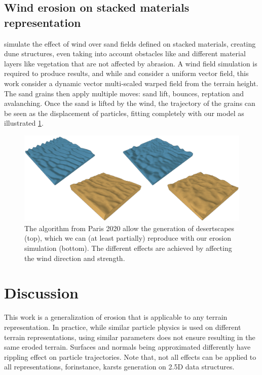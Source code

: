 \subsection{Wind erosion on stacked materials representation}
\citep{Paris2019b} simulate the effect of wind over sand fields defined on stacked materials, creating dune structures, even taking into account obstacles like \cite{Roa2004} and different material layers like vegetation \cite{Cordonnier2017a} that are not affected by abrasion\cite{Paris2019b}. A wind field simulation is required to produce results, and while \cite{Roa2004} and \cite{Onoue2000} consider a uniform vector field, this work consider a dynamic vector multi-scaled warped field from the terrain height. The sand grains then apply multiple moves: sand lift, bounces, reptation and avalanching. Once the sand is lifted by the wind, the trajectory of the grains can be seen as the displacement of particles, fitting completely with our model as illustrated \cref{fig:erosion_screen-paris2020}.
\begin{figure}[ht!]
\centering
\includegraphics{desert.pdf}
\caption{The algorithm from Paris 2020 allow the generation of desertscapes (top), which we can (at least partially) reproduce with our erosion simulation (bottom). The different effects are achieved by affecting the wind direction and strength. }
\label{fig:erosion_screen-paris2020}
\end{figure}

\section{Discussion}
This work is a generalization of erosion that is applicable to any terrain representation. In practice, while similar particle physics is used on different terrain representations, using similar parameters does not ensure resulting in the same eroded terrain. Surfaces and normals being approximated differently have rippling effect on particle trajectories. 
Note that, not all effects can be applied to all representations, forinstance, karsts generation on 2.5D data structures. 

